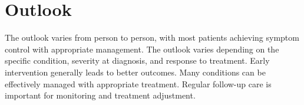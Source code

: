 \section{Outlook}
The outlook varies from person to person, with most patients achieving symptom control with appropriate management. The outlook varies depending on the specific condition, severity at diagnosis, and response to treatment. Early intervention generally leads to better outcomes. Many conditions can be effectively managed with appropriate treatment. Regular follow-up care is important for monitoring and treatment adjustment.
